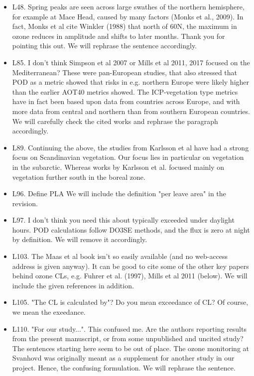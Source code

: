 \documentclass{scrartcl}
\begin{document}
\begin{itemize}
\item {\color{blue}L48. Spring peaks are seen across large swathes of the northern hemisphere, for example at Mace Head, caused by many factors (Monks et al., 2009). In fact, Monks et al cite Winkler (1988) that north of 60N, the maximum in ozone reduces in amplitude and shifts to later months.}
Thank you for pointing this out. We will rephrase the sentence accordingly.

\item {\color{blue}L85. I don't think Simpson et al 2007 or Mills et al 2011, 2017 focused on the Mediterranean? These were pan-European studies, that also stressed that POD as a metric showed that risks in e.g. northern Europe were likely higher than the earlier AOT40 metrics showed. The ICP-vegetation type metrics have in fact been based upon data from countries across Europe, and with more data from central and northern than from southern European countries.}
We will carefully check the cited works and rephrase the paragraph accordingly. 

\item {\color{blue}L89. Continuing the above, the studies from Karlsson et al have had a strong focus on Scandinavian vegetation.}
Our focus lies in particular on vegetation in the subarctic. Whereas works by Karlsson et al. focused mainly on vegetation further south in the boreal zone. 

\item {\color{blue}L96. Define PLA}
We will include the definition "per leave area" in the revision.

\item {\color{blue}L97. I don't think you need this about typically exceeded under daylight hours. POD calculations follow DO3SE methods, and the flux is zero at night by definition.} We will remove it accordingly.

\item {\color{blue}L103. The Maas et al book isn't so easily available (and no web-access address is given anyway). It can be good to cite some of the other key papers behind ozone CLs, e.g. Fuhrer et al. (1997), Mills et al 2011 (below).} We will include the given references in addition.

\item {\color{blue}L105. "The CL is calculated by"? Do you mean exceedance of CL?} Of course, we mean the exeedance.

\item {\color{blue}L110. "For our study...". This confused me. Are the authors reporting results from the present manuscript, or from some unpublished and uncited study? The sentences starting here seem to be out of place.}
The ozone monitoring at Svanhovd was originally meant as a supplement for another study in our project. Hence, the confusing formulation. We will rephrase the sentence.


\end{itemize}
\end{document}

